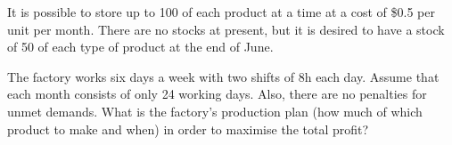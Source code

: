 It is possible to store up to 100 of each product at a time at a cost of \$0.5 per unit per month. There are no stocks at present, but it is desired to have a stock of 50 of each type of product at the end of June. 

The factory works six days a week with two shifts of 8h each day. Assume that each month consists of only 24 working days. Also, there are no penalties for unmet demands. What is the factory's production plan (how much of which product to make and when) in order to maximise the total profit?

